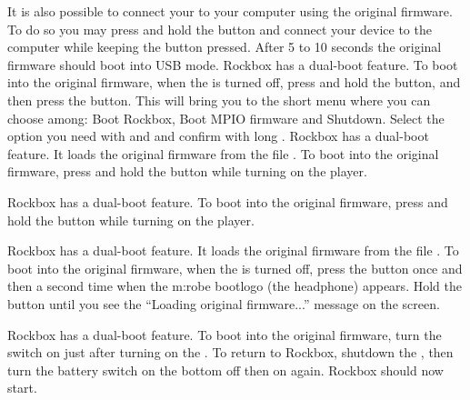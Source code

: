 {{    It is also possible to connect your \dap{} to your computer using the
    original firmware. To do so you may press and hold the \ButtonVolDown{}
    button and connect your device to the computer while keeping the
    \ButtonVolDown{} button pressed. After 5 to 10 seconds the original
    firmware should boot into USB mode.
    }
    {
    Rockbox has a dual-boot feature. To boot into the original firmware,
    when the \dap{} is turned off, press and hold the \ButtonRec{} button,
    and then press the \ButtonPlay{} button. This will bring you to the
    short menu where you can choose among: Boot Rockbox, Boot MPIO firmware
    and Shutdown. Select the option you need with \ButtonRew{} and \ButtonFF{}
    and confirm with long \ButtonPlay{}.
    }
    {
    Rockbox has a dual-boot feature. It loads the original firmware from
    the file . To boot into the original firmware,
    press and hold the \ButtonLeft{} button while turning on the player.
    }

    {
    Rockbox has a dual-boot feature. To boot into the original firmware,
    press and hold the \ButtonLeft{} button while turning on the player.
    }

    {
    }

    {
    Rockbox has a dual-boot feature. It loads the original firmware from
    the file . To boot into the original firmware,
    when the \dap{} is turned off, press the \ButtonPower{} button once and then
    a second time when the m:robe bootlogo (the headphone) appears. Hold the
    \ButtonPower{} button until you see the ``Loading original firmware...''
    message on the screen.
    }

    {
    Rockbox has a dual-boot feature. To boot into the original firmware,
    turn the \ButtonHold{} switch on just after turning on the \dap{}.
    To return to Rockbox, shutdown the \dap{}, then turn the battery switch
    on the bottom off then on again. Rockbox should now start.
    }

}
